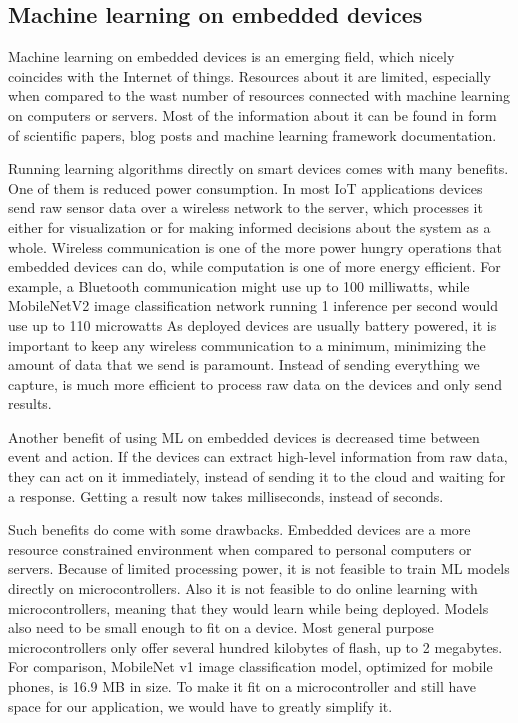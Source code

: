 \subsection{ Machine learning on embedded devices} \label{ml_on_embedded}

Machine learning on embedded devices is an emerging field, which nicely coincides with the Internet of things.
Resources about it are limited, especially when compared to the wast number of resources connected with machine learning on computers or servers.
Most of the information about it can be found in form of scientific papers, blog posts and machine learning framework documentation\cite{hello_edge}\cite{tflite_risc-v}\cite{pete_tiny}.

Running learning algorithms directly on smart devices comes with many benefits.
One of them is reduced power consumption.
In most IoT applications devices send raw sensor data over a wireless network to the server, which processes it either for visualization or for making informed decisions about the system as a whole. 
Wireless communication is one of the more power hungry operations that embedded devices can do, while computation is one of more energy efficient\cite{pete_tiny}.
For example, a Bluetooth communication might use up to 100 milliwatts, while MobileNetV2 image classification network running 1 inference per second would use up to 110 microwatts\cite{pete_tiny}
As deployed devices are usually battery powered, it is important to keep any wireless communication to a minimum, minimizing the amount of data that we send is paramount.
Instead of sending everything we capture, is much more efficient to process raw data on the devices and only send results.

Another benefit of using ML on embedded devices is decreased time between event and action.
If the devices can extract high-level information from raw data, they can act on it immediately, instead of sending it to the cloud and waiting for a response. 
Getting a result now takes milliseconds, instead of seconds.

Such benefits do come with some drawbacks.
Embedded devices are a more resource constrained environment when compared to personal computers or servers.
Because of limited processing power, it is not feasible to train ML models directly on microcontrollers.
Also it is not feasible to do online learning with microcontrollers, meaning that they would learn while being deployed.
Models also need to be small enough to fit on a device. 
Most general purpose microcontrollers only offer several hundred kilobytes of flash, up to 2 megabytes.
For comparison, MobileNet v1 image classification model, optimized for mobile phones, is 16.9 MB in size\cite{daniel_edgeimpulse}.
To make it fit on a microcontroller and still have space for our application, we would have to greatly simplify it.

